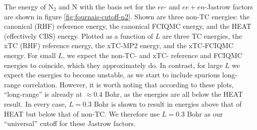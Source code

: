 The energy of N$_2$ and N with the \avtz basis set for the $ee$- and $ee+en$-Jastrow factors are shown in figure \ref{fig:fournais-cutoff-n2}. Shown are three non-TC energies: the canonical (RHF) reference energy, the canonical FCIQMC energy, and the HEAT (effectively \gls{CBS}) energy. Plotted as a function of $L$ are three TC energies, the xTC (RHF) reference energy, the xTC-MP2 energy, and the xTC-FCIQMC energy. For small $L$, we expect the non-TC- and xTC- reference and FCIQMC energies to coincide, which they approximately do. In contrast, for large $L$ we expect the energies to become unstable, as we start to include spurious long-range correlation. However, it is worth noting that according to these plots, ``long-range'' is already at $\approx 0.4$ Bohr, as the energies are all below the HEAT result. In every case, $L=0.3$ Bohr is shown to result in energies above that of HEAT but below that of non-TC. We therefore use $L=0.3$ Bohr as our ``universal'' cutoff for these Jastrow factors.

